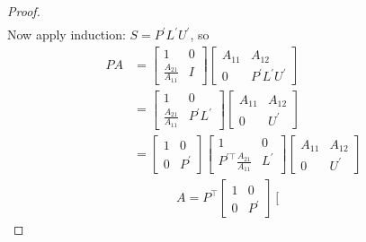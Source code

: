 \documentclass[11pt]{article}
\numberwithin{equation}{section}
\begin{document}
\begin{savenotes}
\begin{theorem}[LU Decomposition]
\begin{proof}
\begin{align*}
            \end{align*}
            Now apply induction: $S = P^\prime L^\prime U^\prime$, so \begin{align*}
                PA &= \left[\begin{array}{ll}
                    1 & 0 \\
                    \frac{A_{21}}{A_{11}} & I
                    \end{array}\right] \left[\begin{array}{cc}
                        A_{11} & A_{12} \\
                        0 & P^{\prime} L^{\prime} U^{\prime}
                        \end{array}\right] \\
                &= \left[\begin{array}{ll}
                    1 & 0 \\
                    \frac{A_{21}}{A_{11}} & P^{\prime} L^{\prime}
                    \end{array}\right] \left[\begin{array}{cc}
                        A_{11} & A_{12} \\
                        0 &  U^{\prime}
                        \end{array}\right] \\
                &= \left[\begin{array}{ll}
                    1 & 0 \\
                    0 & P^{\prime}
                    \end{array}\right] \left[\begin{array}{cc}
                        1 & 0 \\
                        P^{\prime \top}\frac{A_{21}}{A_{11}} &  L^{\prime}
                        \end{array}\right]\left[\begin{array}{cc}
                            A_{11} & A_{12} \\
                            0 &  U^{\prime}
                            \end{array}\right]
            \end{align*}
            \begin{align*}
                A = P^\top \left[\begin{array}{ll}
                    1 & 0 \\
                    0 & P^{\prime}
                    \end{array}\right] \left[\begin{array}{cc}

\end{array}
\end{align*}
\end{proof}
\end{theorem}
\end{savenotes}
\end{document}

